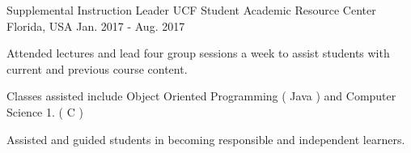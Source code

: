 \begin{cventries}
  \cventry
    {Supplemental Instruction Leader} %
    {UCF Student Academic Resource Center} %
    {Florida, USA} %
    {Jan. 2017 - Aug. 2017} %
    {
      \begin{cvitems} %
        \item {Attended lectures and lead four group sessions a week to assist students with current and previous course content.}
        \item {Classes assisted include Object Oriented Programming ( Java ) and Computer Science 1. ( C )}
        \item {Assisted and guided students in becoming responsible and independent learners.}
      \end{cvitems}
    }

\end{cventries}
